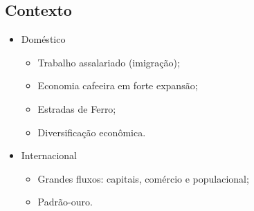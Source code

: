 \documentclass[a4paper,12pt]{article}[abntex2]
\begin{document}
\subsection{\textbf{Contexto}}
\begin{itemize}
    \item Doméstico
    \begin{itemize}
        \item Trabalho assalariado (imigração);
    \end{itemize}
    \begin{itemize}
        \item Economia cafeeira em forte expansão;
    \end{itemize}
    \begin{itemize}
        \item Estradas de Ferro;
    \end{itemize}
    \begin{itemize}
        \item Diversificação econômica.
    \end{itemize}
    \item Internacional
    \begin{itemize}
        \item Grandes fluxos: capitais, comércio e populacional;
    \end{itemize}
    \begin{itemize}
        \item Padrão-ouro.
    \end{itemize}
\end{itemize}
\end{document}
